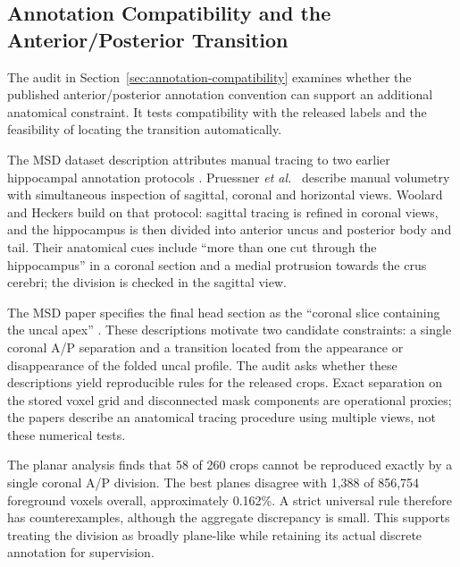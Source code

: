 \documentclass[12pt,a4paper]{article}
\begin{document}
\subsection{Annotation Compatibility and the Anterior/Posterior Transition}
\label{sec:annotation-results}

The audit in Section~\ref{sec:annotation-compatibility} examines whether
the published anterior/posterior annotation convention can support an
additional anatomical constraint. It tests compatibility with the
released labels and the feasibility of locating the transition
automatically.

The MSD dataset description attributes manual tracing to two earlier
hippocampal annotation protocols \cite{simpson2019dataset}.
Pruessner \emph{et al.}\ \cite{pruessner2000volumetry} describe manual volumetry
with simultaneous inspection of sagittal, coronal and horizontal views.
Woolard and Heckers \cite{woolard2012asymmetry} build on that protocol:
sagittal tracing is refined in coronal views, and the hippocampus is then
divided into anterior uncus and posterior body and tail. Their anatomical
cues include ``more than one cut through the hippocampus'' in a coronal
section and a medial protrusion towards the crus cerebri; the division
is checked in the sagittal view.

The MSD paper specifies the final head section as the ``coronal slice
containing the uncal apex'' \cite{simpson2019dataset}. These descriptions
motivate two candidate constraints: a single coronal A/P separation and
a transition located from the appearance or disappearance of the folded
uncal profile. The audit asks whether these descriptions yield
reproducible rules for the released crops. Exact separation on the stored
voxel grid and disconnected mask components are operational proxies;
the papers describe an anatomical tracing procedure using multiple
views, not these numerical tests.

The planar analysis finds that 58 of 260 crops cannot be reproduced
exactly by a single coronal A/P division. The best planes disagree
with 1,388 of 856,754 foreground voxels overall, approximately
0.162\%. A strict universal rule therefore has counterexamples,
although the aggregate discrepancy is small. This supports treating
the division as broadly plane-like while retaining its actual discrete
annotation for supervision.
\end{document}
